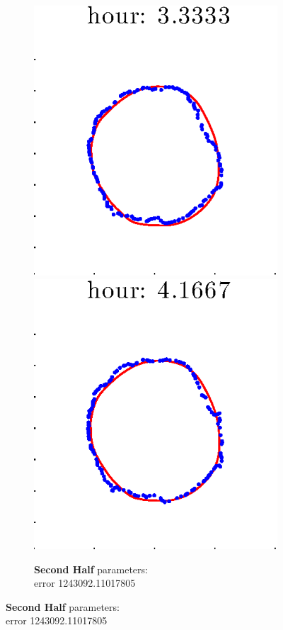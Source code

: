 \documentclass[12pt]{article}
\begin{document}
\begin{figure}[h!]
\begin{subfigure}[b]{.3\textwidth}
		\includegraphics[height=.15\textheight]{Pos0/firsthalf/second5.eps}
		\includegraphics[height=.15\textheight]{Pos0/firsthalf/second6.eps}
		\caption{\textbf{Second Half} parameters: \\error 1243092.11017805}
	\end{subfigure}
\end{figure}
\end{document}
